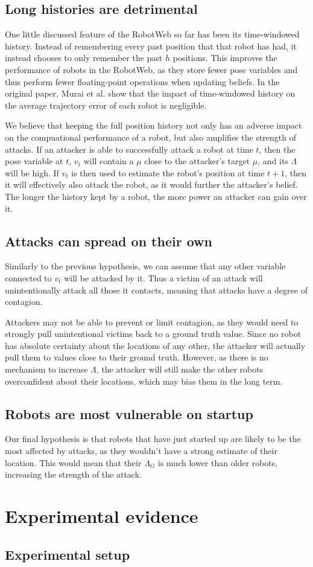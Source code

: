 \subsection{Long histories are detrimental} %
One little discussed feature of the RobotWeb so far has been its time-windowed history. Instead of remembering every past position that that robot has had, it instead chooses to only remember the past $h$ positions. This improves the performance of robots in the RobotWeb, as they store fewer pose variables and thus perform fewer floating-point operations when updating beliefs. In the original paper, Murai et al. show that the impact of time-windowed history on the average trajectory error of each robot is negligible.


We believe that keeping the full position history not only has an adverse impact on the compuational performance of a robot, but also amplifies the strength of attacks. If an attacker is able to successfully attack a robot at time $t$, then the pose variable at $t$, $v_t$ will contain a $\mu$ close to the attacker's target $\mu$, and its $\Lambda$ will be high. If $v_t$ is then used to estimate the robot's position at time $t+1$, then it will effectively also attack the robot, as it would further the attacker's belief. The longer the history kept by a robot, the more power an attacker can gain over it.

\subsection{Attacks can spread on their own} %
Similarly to the previous hypothesis, we can assume that any other variable connected to $v_t$ will be attacked by it. Thus a victim of an attack will unintentionally attack all those it contacts, meaning that attacks have a degree of contagion. 

Attackers may not be able to prevent or limit contagion, as they would need to strongly pull unintentional victims back to a ground truth value. Since no robot has absolute certainty about the locations of any other, the attacker will actually pull them to values close to their ground truth. However, as there is no mechanism to increase $\Lambda$, the attacker will still make the other robots overconfident about their locations, which may bias them in the long term.
\subsection{Robots are most vulnerable on startup}
Our final hypothesis is that robots that have just started up are likely to be the most affected by attacks, as they wouldn't have a strong estimate of their location. This would mean that their $\Lambda_G$ is much lower than older robots, increasing the strength of the attack.

\section{Experimental evidence}
\subsection{Experimental setup}
